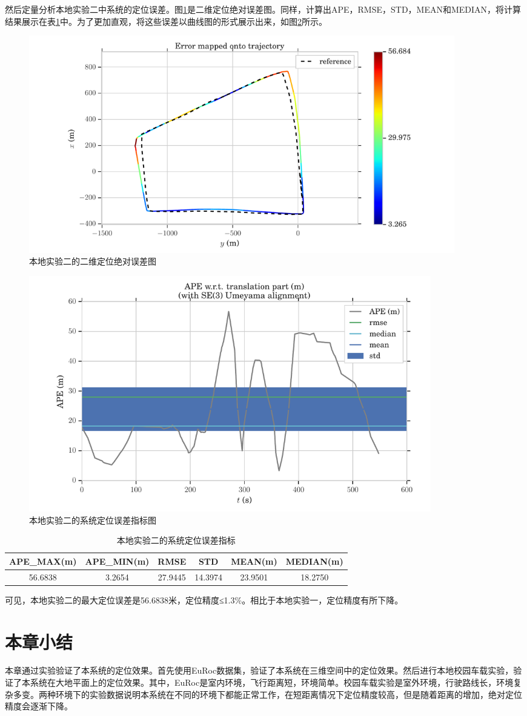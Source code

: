 然后定量分析本地实验二中系统的定位误差。图\ref{fig5_21}是二维定位绝对误差图。同样，计算出APE，RMSE，STD，MEAN和MEDIAN，将计算结果展示在表\ref{tab:5.4}中。为了更加直观，将这些误差以曲线图的形式展示出来，如图\ref{fig5_22}所示。\newpage
\begin{figure}[!h]
	\centering
	\includegraphics[width=0.90\textwidth]{figures/chapter5/ape_map_5km}
	\caption{本地实验二的二维定位绝对误差图}\label{fig5_21}
\end{figure}
\begin{figure}[!h]\setlength{\belowcaptionskip}{-12pt}
	\centering
	\includegraphics[width=0.85\textwidth]{figures/chapter5/ape_err_5km}
	\caption{本地实验二的系统定位误差指标图}\label{fig5_22}
\end{figure}
\begin{table}[!h]\setlength{\abovecaptionskip}{6pt}
	\centering
	\caption{本地实验二的系统定位误差指标} \label{tab:5.4}
	\begin{tabular*}{0.9\textwidth}{@{\extracolsep{\fill}}cccccc}
		\toprule
		APE\_MAX(m)&APE\_MIN(m) &RMSE	&STD	&MEAN(m)	&MEDIAN(m) \\
		\midrule
		56.6838	&3.2654	&27.9445	&14.3974	&23.9501	&18.2750 \\
		\bottomrule
	\end{tabular*}
\end{table}

可见，本地实验二的最大定位误差是56.6838米，定位精度≤1.3\%。相比于本地实验一，定位精度有所下降。
\section{本章小结}
本章通过实验验证了本系统的定位效果。首先使用EuRoc数据集，验证了本系统在三维空间中的定位效果。然后进行本地校园车载实验，验证了本系统在大地平面上的定位效果。其中，EuRoc是室内环境，飞行距离短，环境简单。校园车载实验是室外环境，行驶路线长，环境复杂多变。两种环境下的实验数据说明本系统在不同的环境下都能正常工作，在短距离情况下定位精度较高，但是随着距离的增加，绝对定位精度会逐渐下降。